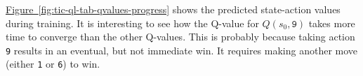 \documentclass{article}
\begin{document}
\begin{figure}[!h]
    \centering
     \hspace{0.1in}
     \hspace{0.1in}
     \hspace{0.1in}
     \hspace{0.1in}
    \caption{}
    \label{fig:tic-ql-qvalues}
\end{figure}

\hyperref[fig:tic-ql-tab-qvalues-progress] {Figure~\ref*{fig:tic-ql-tab-qvalues-progress}} shows the
predicted state-action values during training. It is interesting to see how the Q-value for $Q(s_0,
\texttt{9})$ takes more time to converge than the other Q-values. This is probably because taking
action \texttt{9} results in an eventual, but not immediate win. It requires making another move
(either \texttt{1} or \texttt{6}) to win.
\end{document}
